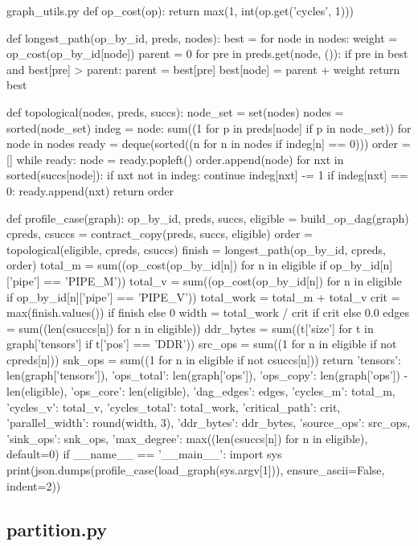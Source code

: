 \begin{Python}{graph\_utils.py}
def op_cost(op):
    return max(1, int(op.get('cycles', 1)))

def longest_path(op_by_id, preds, nodes):
    best = {}
    for node in nodes:
        weight = op_cost(op_by_id[node])
        parent = 0
        for pre in preds.get(node, ()):
            if pre in best and best[pre] > parent:
                parent = best[pre]
        best[node] = parent + weight
    return best

def topological(nodes, preds, succs):
    node_set = set(nodes)
    nodes = sorted(node_set)
    indeg = {node: sum((1 for p in preds[node] if p in node_set)) for node in nodes}
    ready = deque(sorted((n for n in nodes if indeg[n] == 0)))
    order = []
    while ready:
        node = ready.popleft()
        order.append(node)
        for nxt in sorted(succs[node]):
            if nxt not in indeg:
                continue
            indeg[nxt] -= 1
            if indeg[nxt] == 0:
                ready.append(nxt)
    return order

def profile_case(graph):
    op_by_id, preds, succs, eligible = build_op_dag(graph)
    cpreds, csuccs = contract_copy(preds, succs, eligible)
    order = topological(eligible, cpreds, csuccs)
    finish = longest_path(op_by_id, cpreds, order)
    total_m = sum((op_cost(op_by_id[n]) for n in eligible if op_by_id[n]['pipe'] == 'PIPE_M'))
    total_v = sum((op_cost(op_by_id[n]) for n in eligible if op_by_id[n]['pipe'] == 'PIPE_V'))
    total_work = total_m + total_v
    crit = max(finish.values()) if finish else 0
    width = total_work / crit if crit else 0.0
    edges = sum((len(csuccs[n]) for n in eligible))
    ddr_bytes = sum((t['size'] for t in graph['tensors'] if t['pos'] == 'DDR'))
    src_ops = sum((1 for n in eligible if not cpreds[n]))
    snk_ops = sum((1 for n in eligible if not csuccs[n]))
    return {'tensors': len(graph['tensors']), 'ops_total': len(graph['ops']), 'ops_copy': len(graph['ops']) - len(eligible), 'ops_core': len(eligible), 'dag_edges': edges, 'cycles_m': total_m, 'cycles_v': total_v, 'cycles_total': total_work, 'critical_path': crit, 'parallel_width': round(width, 3), 'ddr_bytes': ddr_bytes, 'source_ops': src_ops, 'sink_ops': snk_ops, 'max_degree': max((len(csuccs[n]) for n in eligible), default=0)}
if __name__ == '__main__':
    import sys
    print(json.dumps(profile_case(load_graph(sys.argv[1])), ensure_ascii=False, indent=2))
\end{Python}

\subsection{partition.py}

